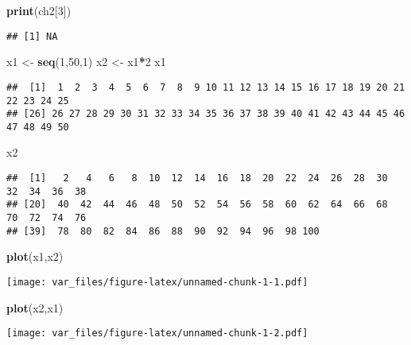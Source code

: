 \documentclass[
]{article}
\newenvironment{Shaded}{\begin{snugshade}}{\end{snugshade}}
\newcommand{\DecValTok}[1]{\textcolor[rgb]{0.00,0.00,0.81}{#1}}
\newcommand{\FunctionTok}[1]{\textcolor[rgb]{0.13,0.29,0.53}{\textbf{#1}}}
\newcommand{\NormalTok}[1]{#1}
\newcommand{\OtherTok}[1]{\textcolor[rgb]{0.56,0.35,0.01}{#1}}
\newcommand{\SpecialCharTok}[1]{\textcolor[rgb]{0.81,0.36,0.00}{\textbf{#1}}}
\begin{document}
\begin{Shaded}
\begin{Highlighting}[]
\FunctionTok{print}\NormalTok{(ch2[}\DecValTok{3}\NormalTok{])}
\end{Highlighting}
\end{Shaded}

\begin{verbatim}
## [1] NA
\end{verbatim}

\begin{Shaded}
\begin{Highlighting}[]
\NormalTok{x1 }\OtherTok{\textless{}{-}} \FunctionTok{seq}\NormalTok{(}\DecValTok{1}\NormalTok{,}\DecValTok{50}\NormalTok{,}\DecValTok{1}\NormalTok{)}
\NormalTok{x2 }\OtherTok{\textless{}{-}}\NormalTok{ x1}\SpecialCharTok{*}\DecValTok{2}
\NormalTok{x1 }
\end{Highlighting}
\end{Shaded}

\begin{verbatim}
##  [1]  1  2  3  4  5  6  7  8  9 10 11 12 13 14 15 16 17 18 19 20 21 22 23 24 25
## [26] 26 27 28 29 30 31 32 33 34 35 36 37 38 39 40 41 42 43 44 45 46 47 48 49 50
\end{verbatim}

\begin{Shaded}
\begin{Highlighting}[]
\NormalTok{x2 }
\end{Highlighting}
\end{Shaded}

\begin{verbatim}
##  [1]   2   4   6   8  10  12  14  16  18  20  22  24  26  28  30  32  34  36  38
## [20]  40  42  44  46  48  50  52  54  56  58  60  62  64  66  68  70  72  74  76
## [39]  78  80  82  84  86  88  90  92  94  96  98 100
\end{verbatim}

\begin{Shaded}
\begin{Highlighting}[]
\FunctionTok{plot}\NormalTok{(x1,x2)}
\end{Highlighting}
\end{Shaded}

\texttt{[image: var\_files/figure-latex/unnamed-chunk-1-1.pdf]}

\begin{Shaded}
\begin{Highlighting}[]
\FunctionTok{plot}\NormalTok{(x2,x1)}
\end{Highlighting}
\end{Shaded}

\texttt{[image: var\_files/figure-latex/unnamed-chunk-1-2.pdf]}
\end{document}
